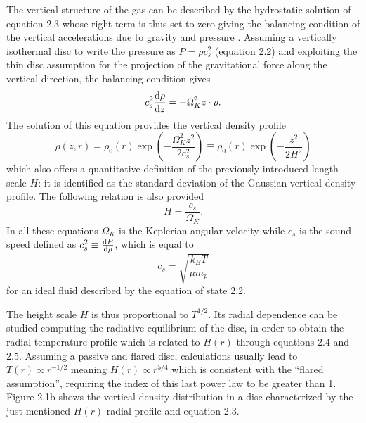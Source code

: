 \documentclass[a4paper,10pt]{report}
\begin{document}
The vertical structure of the gas can be described by the hydrostatic solution
of equation 2.3 whose right term is thus set to zero giving the balancing condition of the vertical
accelerations due to gravity and pressure \citep[pp. 38-41]{book_planet_form}. Assuming a vertically isothermal disc to write the pressure as $P=\rho c_s^2$ (equation 2.2)
and exploiting the thin 
disc assumption for the projection of the gravitational
 force along the vertical direction,
the balancing condition gives
\begin{equation}
    c_s^2\dv{\rho}{z}= -\Omega_K^2z\cdot \rho.
\end{equation}
The solution of this equation provides the vertical density profile
\begin{equation}
    \rho(z, r) = \rho_0(r)\exp(-\frac{\Omega_K^2z^2}{2c_s^2}) \equiv \rho_0(r)\exp(-\frac{z^2}{2H^2})
\end{equation}
which also offers a quantitative definition of the previously introduced length scale
$H$: it is identified as the 
standard deviation of the Gaussian vertical density profile.
The following relation is also provided
\begin{equation}
    H = \frac{c_s}{\Omega_K}.
\end{equation}
In all these equations $\Omega_K$ is the Keplerian 
angular velocity while $c_s$ is the sound speed defined as $c_s^2 \equiv \dv{P}{\rho}$, which is equal to 
\begin{equation}
    c_s = \sqrt{\frac{k_BT}{\mu m_p}}
\end{equation}
for an 
ideal fluid described by the equation of state 2.2.

The height scale $H$ is thus proportional to $T^{1/2}$. Its radial dependence
can be studied computing the radiative equilibrium of the disc, in order to obtain the 
radial temperature profile which is related to $H(r)$ through equations 2.4 and 2.5.
Assuming a passive and flared disc, calculations usually lead to $T(r) \propto r^{-1/2}$ 
meaning $H(r) \propto r^{5/4}$ which is consistent with the ``flared assumption'', requiring the index of this last
power law to be greater than 1.
Figure 2.1b shows the vertical density distribution in a disc characterized by the just mentioned $H(r)$ radial profile
and equation 2.3.
\end{document}
